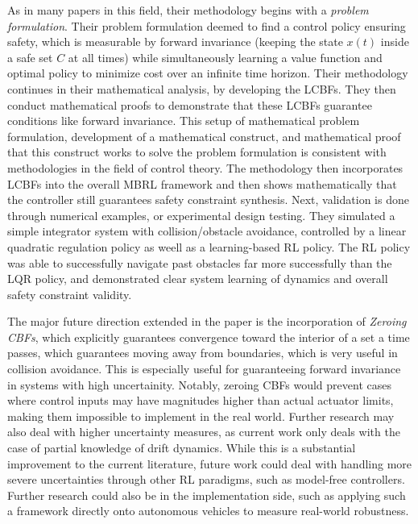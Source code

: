 \documentclass[10pt, oneside]{article}
\newenvironment{problem}[2][Problem]{\begin{trivlist}
    \item[\hskip \labelsep {\bfseries #1}\hskip \labelsep {\bfseries #2.}]}{\end{trivlist}}
\begin{document}
\begin{problem}{$\#5$}
As in many papers in this field, their methodology begins with a \textit{problem formulation}. Their problem formulation deemed to find a control policy ensuring safety, which is measurable by forward invariance  (keeping the state $x(t)$ inside a safe set $C$ at all times) while simultaneously learning a value function and optimal policy to minimize cost over an infinite time horizon. Their methodology continues in their mathematical analysis, by developing the LCBFs. They then conduct mathematical proofs to demonstrate that these LCBFs guarantee conditions like forward invariance. This setup of mathematical problem formulation, development of a mathematical construct, and mathematical proof that this construct works to solve the problem formulation is consistent with methodologies in the field of control theory. The methodology then incorporates LCBFs into the overall MBRL framework and then shows mathematically that the controller still guarantees safety constraint synthesis. Next, validation is done through numerical examples, or experimental design testing. They simulated a simple integrator system with collision/obstacle avoidance, controlled by a linear quadratic regulation policy as weell as a learning-based RL policy. The RL policy was able to successfully navigate past obstacles far more successfully than the LQR policy, and demonstrated clear system learning of dynamics and overall safety constraint validity. 
\end{problem}

\begin{problem}{$\#6$}
The major future direction extended in the paper is the incorporation of \textit{Zeroing CBFs}, which explicitly guarantees convergence toward the interior of a set a time passes, which guarantees moving away from boundaries, which is very useful in collision avoidance. This is especially useful for guaranteeing forward invariance in systems with high uncertainity. Notably, zeroing CBFs would prevent cases where control inputs may have magnitudes higher than actual actuator limits, making them impossible to implement in the real world. Further research may also deal with higher uncertainty measures, as current work only deals with the case of partial knowledge of drift dynamics. While this is a substantial improvement to the current literature, future work could deal with handling more severe uncertainties through other RL paradigms, such as model-free controllers. Further research could also be in the implementation side, such as applying such a framework directly onto autonomous vehicles to measure real-world robustness. 
\end{problem}
\end{document}
